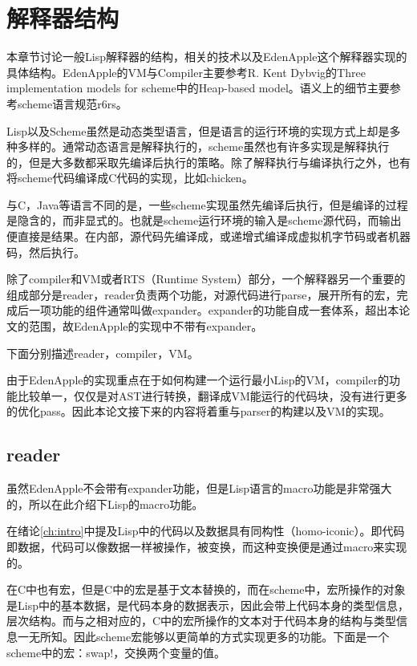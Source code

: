 %
%

\chapter{解释器结构}

本章节讨论一般Lisp解释器的结构，相关的技术以及EdenApple这个解释器实现的具体结构。EdenApple的VM与Compiler主要参考R. Kent Dybvig的Three implementation models for scheme\cite{dybvig87timpl}中的Heap-based model。语义上的细节主要参考scheme语言规范r6rs\cite{r6rs}。

Lisp以及Scheme虽然是动态类型语言，但是语言的运行环境的实现方式上却是多种多样的。通常动态语言是解释执行的，scheme虽然也有许多实现是解释执行的，但是大多数都采取先编译后执行的策略。除了解释执行与编译执行之外，也有将scheme代码编译成C代码的实现，比如chicken。

与C，Java等语言不同的是，一些scheme实现虽然先编译后执行，但是编译的过程是隐含的，而非显式的。也就是scheme运行环境的输入是scheme源代码，而输出便直接是结果。在内部，源代码先编译成，或递增式编译成虚拟机字节码或者机器码，然后执行。

除了compiler和VM或者RTS（Runtime System）部分，一个解释器另一个重要的组成部分是reader，reader负责两个功能，对源代码进行parse，展开所有的宏，完成后一项功能的组件通常叫做expander。expander的功能自成一套体系，超出本论文的范围，故EdenApple的实现中不带有expander。

下面分别描述reader，compiler，VM。

由于EdenApple的实现重点在于如何构建一个运行最小Lisp的VM，compiler的功能比较单一，仅仅是对AST进行转换，翻译成VM能运行的代码块，没有进行更多的优化pass。因此本论文接下来的内容将着重与parser的构建以及VM的实现。

\section{reader}

虽然EdenApple不会带有expander功能，但是Lisp语言的macro功能是非常强大的，所以在此介绍下Lisp的macro功能。

在绪论\ref{ch:intro}中提及Lisp中的代码以及数据具有同构性（homo-iconic）。即代码即数据，代码可以像数据一样被操作，被变换，而这种变换便是通过macro来实现的。

在C中也有宏，但是C中的宏是基于文本替换的，而在scheme中，宏所操作的对象是Lisp中的基本数据，是代码本身的数据表示，因此会带上代码本身的类型信息，层次结构。而与之相对应的，C中的宏所操作的文本对于代码本身的结构与类型信息一无所知。因此scheme宏能够以更简单的方式实现更多的功能。下面是一个scheme中的宏：swap!，交换两个变量的值。

